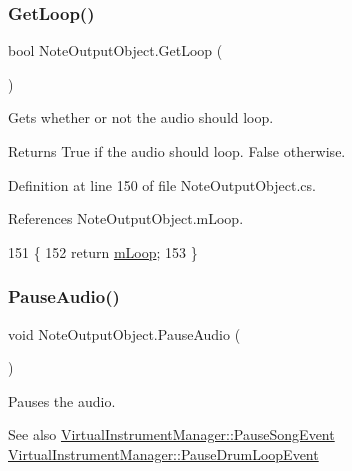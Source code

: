 \subsubsection{\texorpdfstring{Get\+Loop()}{GetLoop()}}
{\footnotesize\ttfamily bool Note\+Output\+Object.\+Get\+Loop (\begin{DoxyParamCaption}{ }\end{DoxyParamCaption})}



Gets whether or not the audio should loop. 

\begin{DoxyReturn}{Returns}
True if the audio should loop. False otherwise. 
\end{DoxyReturn}


Definition at line 150 of file Note\+Output\+Object.\+cs.



References Note\+Output\+Object.\+m\+Loop.


\begin{DoxyCode}
151     \{
152         \textcolor{keywordflow}{return} \hyperlink{group___n_o_o_priv_var_gabf1d5013f44773e9fd3e4dbb59d74aeb}{mLoop};
153     \}
\end{DoxyCode}
\mbox{\label{group___n_o_o_pub_func_ga7977bc941f355866c7e4c141a8f7b8bb}} 
\subsubsection{\texorpdfstring{Pause\+Audio()}{PauseAudio()}}
{\footnotesize\ttfamily void Note\+Output\+Object.\+Pause\+Audio (\begin{DoxyParamCaption}{ }\end{DoxyParamCaption})}



Pauses the audio. 

\begin{DoxySeeAlso}{See also}
\hyperlink{group___v_i_m_event_types_class_virtual_instrument_manager_1_1_pause_song_event}{Virtual\+Instrument\+Manager\+::\+Pause\+Song\+Event} \hyperlink{group___v_i_m_event_types_class_virtual_instrument_manager_1_1_pause_drum_loop_event}{Virtual\+Instrument\+Manager\+::\+Pause\+Drum\+Loop\+Event} 
\end{DoxySeeAlso}


